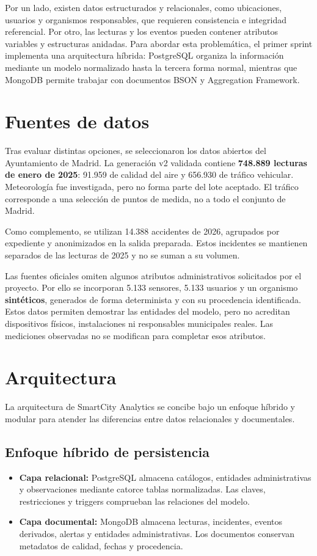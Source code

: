 \documentclass[12pt,letterpaper]{article}
\begin{document}
Por un lado, existen datos estructurados y relacionales, como ubicaciones,
usuarios y organismos responsables, que requieren consistencia e integridad
referencial. Por otro, las lecturas y los eventos pueden contener atributos
variables y estructuras anidadas. Para abordar esta problemática, el primer sprint
implementa una arquitectura híbrida: PostgreSQL organiza la información mediante
un modelo normalizado hasta la tercera forma normal, mientras que MongoDB permite
trabajar con documentos BSON y Aggregation Framework.

\section{Fuentes de datos}

Tras evaluar distintas opciones, se seleccionaron los datos abiertos del
Ayuntamiento de Madrid. La generación v2 validada contiene \textbf{748.889 lecturas
de enero de 2025}: 91.959 de calidad del aire y 656.930 de tráfico vehicular.
Meteorología fue investigada, pero no forma parte del lote aceptado. El tráfico
corresponde a una selección de puntos de medida, no a todo el conjunto de Madrid.

Como complemento, se utilizan 14.388 accidentes de 2026, agrupados por expediente
y anonimizados en la salida preparada. Estos incidentes se mantienen separados
de las lecturas de 2025 y no se suman a su volumen.

Las fuentes oficiales omiten algunos atributos administrativos solicitados por el
proyecto. Por ello se incorporan 5.133 sensores, 5.133 usuarios y un organismo
\textbf{sintéticos}, generados de forma determinista y con su procedencia
identificada. Estos datos permiten demostrar las entidades del modelo, pero no
acreditan dispositivos físicos, instalaciones ni responsables municipales reales.
Las mediciones observadas no se modifican para completar esos atributos.

\section{Arquitectura}

La arquitectura de SmartCity Analytics se concibe bajo un enfoque híbrido y
modular para atender las diferencias entre datos relacionales y documentales.

\subsection{Enfoque híbrido de persistencia}
\begin{itemize}
    \item \textbf{Capa relacional:} PostgreSQL almacena catálogos, entidades
    administrativas y observaciones mediante catorce tablas normalizadas.
    Las claves, restricciones y triggers comprueban las relaciones del modelo.
    \item \textbf{Capa documental:} MongoDB almacena lecturas, incidentes,
    eventos derivados, alertas y entidades administrativas. Los documentos
    conservan metadatos de calidad, fechas y procedencia.
\end{itemize}
\end{document}
